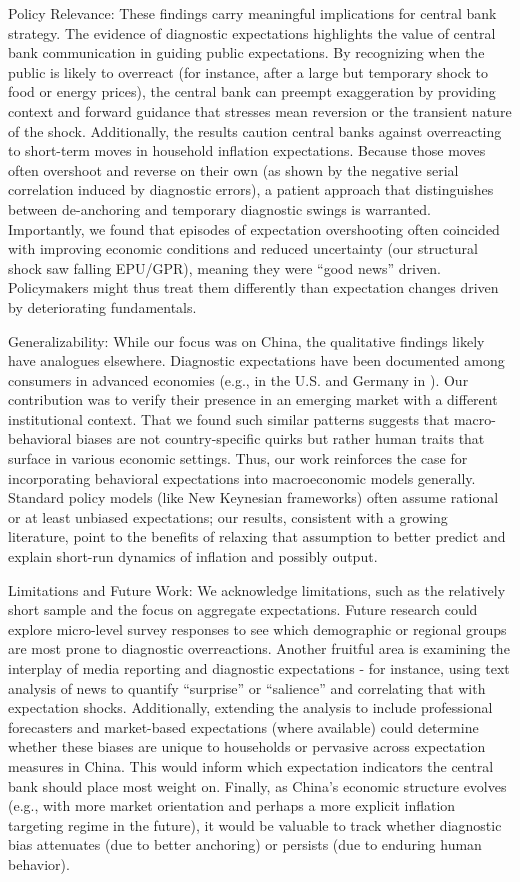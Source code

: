 \documentclass[12pt]{article}
\begin{document}
Policy Relevance: These findings carry meaningful implications for central bank strategy. The evidence of diagnostic expectations highlights the value of central bank communication in guiding public expectations. By recognizing when the public is likely to overreact (for instance, after a large but temporary shock to food or energy prices), the central bank can preempt exaggeration by providing context and forward guidance that stresses mean reversion or the transient nature of the shock. Additionally, the results caution central banks against overreacting to short-term moves in household inflation expectations. Because those moves often overshoot and reverse on their own (as shown by the negative serial correlation induced by diagnostic errors), a patient approach that distinguishes between de-anchoring and temporary diagnostic swings is warranted. Importantly, we found that episodes of expectation overshooting often coincided with improving economic conditions and reduced uncertainty (our structural shock saw falling EPU/GPR), meaning they were “good news” driven. Policymakers might thus treat them differently than expectation changes driven by deteriorating fundamentals.

Generalizability: While our focus was on China, the qualitative findings likely have analogues elsewhere. Diagnostic expectations have been documented among consumers in advanced economies (e.g., in the U.S. and Germany in \cite{Bordalo2018}). Our contribution was to verify their presence in an emerging market with a different institutional context. That we found such similar patterns suggests that macro-behavioral biases are not country-specific quirks but rather human traits that surface in various economic settings. Thus, our work reinforces the case for incorporating behavioral expectations into macroeconomic models generally. Standard policy models (like New Keynesian frameworks) often assume rational or at least unbiased expectations; our results, consistent with a growing literature, point to the benefits of relaxing that assumption to better predict and explain short-run dynamics of inflation and possibly output.

Limitations and Future Work: We acknowledge limitations, such as the relatively short sample and the focus on aggregate expectations. Future research could explore micro-level survey responses to see which demographic or regional groups are most prone to diagnostic overreactions. Another fruitful area is examining the interplay of media reporting and diagnostic expectations - for instance, using text analysis of news to quantify “surprise” or “salience” and correlating that with expectation shocks. Additionally, extending the analysis to include professional forecasters and market-based expectations (where available) could determine whether these biases are unique to households or pervasive across expectation measures in China. This would inform which expectation indicators the central bank should place most weight on. Finally, as China's economic structure evolves (e.g., with more market orientation and perhaps a more explicit inflation targeting regime in the future), it would be valuable to track whether diagnostic bias attenuates (due to better anchoring) or persists (due to enduring human behavior).
\end{document}
